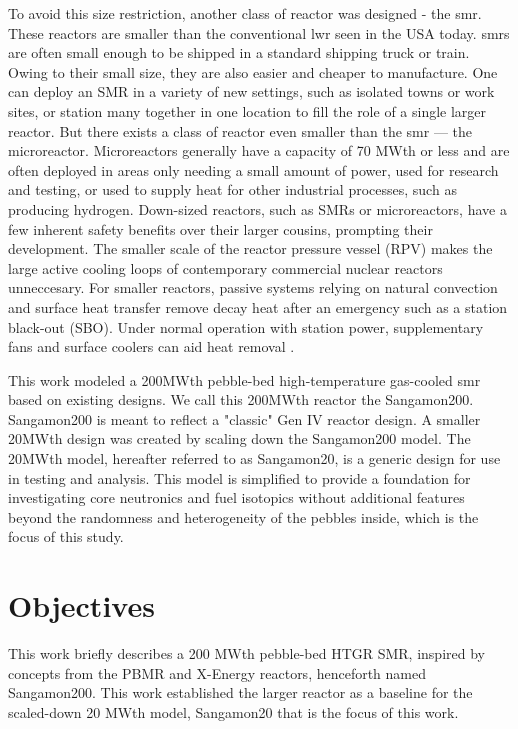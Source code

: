 To avoid this size restriction, another class of reactor was designed - the \acrfull{smr}.  These reactors are smaller than the conventional \acrshort{lwr} seen in the USA today.  \acrshort{smr}s are often small enough to be shipped in a standard shipping truck or train.  Owing to their small size, they are also easier and cheaper to manufacture.  One can deploy an SMR in a variety of new settings, such as isolated towns or work sites, or station many together in one location to fill the role of a single larger reactor.  But there exists a class of reactor even smaller than the \acrshort{smr} --- the microreactor.  Microreactors generally have a capacity of 70 MWth or less and are often deployed in areas only needing a small amount of power, used for research and testing, or used to supply heat for other industrial processes, such as producing hydrogen.  Down-sized reactors, such as SMRs or microreactors, have a few inherent safety benefits over their larger cousins, prompting their development.  The smaller scale of the reactor pressure vessel (RPV) makes the large active cooling loops of contemporary commercial nuclear reactors unneccesary.  For smaller reactors, passive systems relying on natural convection and surface heat transfer remove decay heat after an emergency such as a station black-out (SBO).  Under normal operation with station power, supplementary fans and surface coolers can aid heat removal \cite{reutler_advantages_1984}.


This work modeled a 200MWth pebble-bed high-temperature gas-cooled \acrshort{smr} based on existing designs.  We call this 200MWth reactor the Sangamon200.  Sangamon200 is meant to reflect a "classic" Gen IV reactor design.  A smaller 20MWth design was created by scaling down the Sangamon200 model.  The 20MWth model, hereafter referred to as Sangamon20, is a generic design for use in testing and analysis.  This model is simplified to provide a foundation for investigating core neutronics and fuel isotopics without additional features beyond the randomness and heterogeneity of the pebbles inside, which is the focus of this study.


\section{Objectives}

This work briefly describes a 200 MWth pebble-bed HTGR SMR, inspired by concepts from the PBMR \cite{venter_pbmr_2005, noauthor_pebble_2017} and X-Energy \cite{harlan_x-energy_2018} reactors, henceforth named Sangamon200.  This work established the larger reactor as a baseline for the scaled-down 20 MWth model, Sangamon20 that is the focus of this work.

